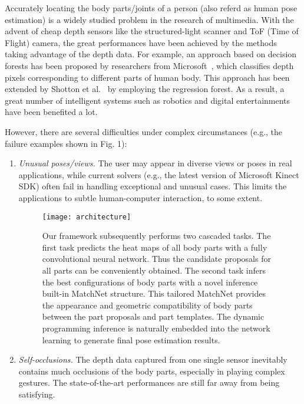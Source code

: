 \documentclass{sig-alternate-05-2015}
\begin{document}
Accurately locating the body parts/joints of a person (also referd as human pose estimation) is a widely studied problem in the research of multimedia. With the advent of cheap depth sensors like the structured-light scanner and ToF (Time of Flight) camera, the great performances have been achieved by the methods taking advantage of the depth data. For example, an approach based on decision forests has been proposed by researchers from Microsoft~\cite{rf11cvpr}, which classifies depth pixels corresponding to different parts of human body. This approach has been extended by Shotton et al.~\cite{rf12pami} by employing the regression forest. As a result, a great number of intelligent systems such as robotics and digital entertainments have been benefited a lot.


However, there are several difficulties under complex circumstances (e.g., the failure examples shown in Fig. 1):
\begin{enumerate}
 
\item \emph{Unusual poses/views.} The user may appear in diverse views or poses in real applications, while current solvers (e.g., the latest version of Microsoft Kinect SDK) often fail in handling exceptional and unusual cases. This limits the applications to subtle human-computer interaction, to some extent. 

\begin{figure}[!htb]
\centering
\texttt{[image: architecture]}
\caption{Our framework subsequently performs two cascaded tasks. The first task predicts the heat maps of all body parts with a fully convolutional neural network. Thus the candidate proposals for all parts can be conveniently obtained. The second task infers the best configurations of body parts with a novel inference built-in MatchNet structure. This tailored MatchNet provides the appearance and geometric compatibility of body parts between the part proposals and part templates. The dynamic programming inference is naturally embedded into the network learning to generate final pose estimation results.}\label{fig:framework}
\end{figure} 

\item \emph{Self-occlusions.} The depth data captured from one single sensor inevitably contains much occlusions of the body parts, especially in playing complex gestures. The state-of-the-art performances are still far away from being satisfying. 
\end{enumerate}
\end{document}
